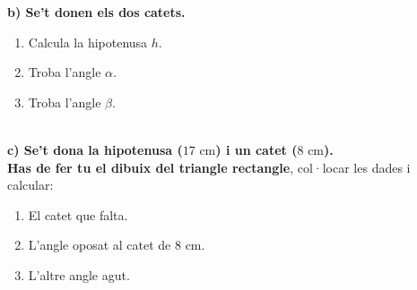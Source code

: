 \documentclass[12pt,a4paper]{article}
\begin{document}
\textbf{b) Se't donen els dos catets.} \\
\begin{minipage}{0.45\textwidth}
\end{minipage}
\begin{minipage}{0.5\textwidth}
    \begin{enumerate}
        \item Calcula la hipotenusa $h$.
        \vspace{1cm}
        \item Troba l'angle $\alpha$.
        \vspace{1.5cm}
        \item Troba l'angle $\beta$. 
        \vspace{1cm}
    \end{enumerate}
\end{minipage} \\
\newpage
\textbf{c) Se't dona la hipotenusa ($17\text{ cm}$) i un catet ($8\text{ cm}$).} \\
\textbf{Has de fer tu el dibuix del triangle rectangle}, col·locar les dades i calcular:
\begin{enumerate}
    \item El catet que falta.
    \item L'angle oposat al catet de $8\text{ cm}$.
    \item L'altre angle agut.
\end{enumerate}

\vspace{6cm}
\end{document}
